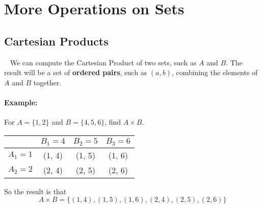 \documentclass[a4paper,12pt]{book}
\title{}
\author{Rachel Morris}
\date{\today}
\begin{document}
    \togglefalse{answerkey}


    \section{More Operations on Sets}

    \subsection{Cartesian Products}

    \begin{intro}{\ }
        We can compute the Cartesian Product of two sets, such as $A$ and $B$.
        The result will be a set of \textbf{ordered pairs}, such as $(a, b)$, combining
        the elements of $A$ and $B$ together.

        \paragraph{Example:} For $A = \{1, 2\}$ and $B = \{4, 5, 6\}$, find $A \times B$.

        \begin{center}
            \begin{tabular}{c | c | c | c}
                & $B_{1} = 4$ & $B_{2} = 5$ & $B_{3} = 6$
                \\ \hline
                $A_{1} = 1$ & (1, 4) & (1, 5) & (1, 6)
                \\
                $A_{2} = 2$ & (2, 4) & (2, 5) & (2, 6)
            \end{tabular}
        \end{center}

        So the result is that
        $$ A \times B = \{ (1, 4), (1, 5), (1, 6), (2, 4), (2, 5), (2, 6) \} $$
    \end{intro}
\end{document}
